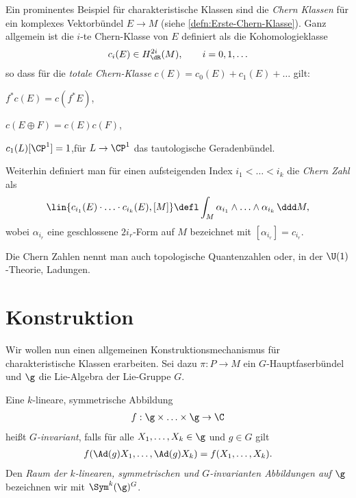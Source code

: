 \documentclass[%
	paper=a5,%
	fleqn,%
	DIV=18,%
	BCOR=0mm,
	fontsize=11pt,
	titlepage=false,%
	bibliography=totoc,
	DIV=18,%
	twoside=true,
	pdftitle=Riemannsche Geometrie,
	pdfauthor=Uwe Semmelmann,
	numbers=noendperiod]%
	{scrbook}
\begin{document}
\begin{ex}
Ein prominentes Beispiel für charakteristische Klassen sind die \emph{Chern
Klassen} für ein komplexes Vektorbündel $E\to M$ (siehe
\ref{defn:Erste-Chern-Klasse}). Ganz allgemein ist die $i$-te
Chern-Klasse von $E$ definiert als die Kohomologieklasse
\begin{align*}
c_i(E)\in H_\dR^{2i}(M),\qquad i =0,1,\ldots 
\end{align*}
so dass für die \emph{totale Chern-Klasse} $c(E) = c_0(E) + c_1(E) + \ldots$
gilt:
\begin{defnenum}
\item $f^*c(E) = c(f^*E)$,
\item $c(E\oplus F) = c(E)c(F)$,
\item $c_1(L) [\CP^1] = 1$,\quad für $L\to \CP^1$ das tautologische
Geradenbündel.
\end{defnenum}

Weiterhin definiert man für einen aufsteigenden Index $i_1 < \ldots < i_k$
die \emph{Chern Zahl} als
\begin{align*}
\lin{c_{i_1}(E)\cdot \ldots \cdot c_{i_k}(E),[M]}
\defl
\int_M \alpha_{i_1}\wedge \ldots \wedge \alpha_{i_k}\, \ddd M,
\end{align*}
wobei $\alpha_{i_r}$ eine geschlossene $2i_r$-Form auf $M$ bezeichnet mit
$[\alpha_{i_r}] = c_{i_r}$.

Die Chern Zahlen nennt man auch topologische Quantenzahlen oder, in der
$\U(1)$-Theorie, Ladungen.\boxc
\end{ex}

\section{Konstruktion}

Wir wollen nun einen allgemeinen Konstruktionsmechanismus für charakteristische
Klassen erarbeiten. Sei dazu $\pi\colon P\to M$ ein $G$-Hauptfaserbündel und $\g$ die
Lie-Algebra der Lie-Gruppe $G$.

\begin{defn}
Eine $k$-lineare, symmetrische Abbildung
\begin{align*}
f : \g\times \ldots \times \g \to \C
\end{align*}
heißt \emph{$G$-invariant}, falls für alle $X_1,\ldots,X_k\in \g$ und $g\in G$
gilt
\begin{align*}
f(\Ad(g)X_1,\ldots,\Ad(g)X_k) = f(X_1,\ldots,X_k).
\end{align*}
Den \emph{Raum der $k$-linearen, symmetrischen und $G$-invarianten Abbildungen
auf $\g$} bezeichnen wir mit \emph{$\Sym^k(\g)^G$}.\fish
\end{defn}
\end{document}

